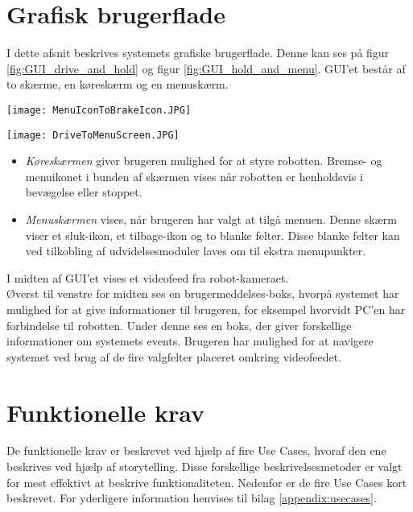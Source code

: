 \section{Grafisk brugerflade}
I dette afsnit beskrives systemets grafiske brugerflade. Denne kan ses på figur \ref{fig:GUI_drive_and_hold} og figur \ref{fig:GUI_hold_and_menu}.
GUI'et består af to skærme, en køreskærm og en menuskærm. 

\begin{center}
	\texttt{[image: MenuIconToBrakeIcon.JPG]}
	\label{fig:GUI_drive_and_hold}
\end{center}

\begin{center}
	\texttt{[image: DriveToMenuScreen.JPG]}
	\label{fig:GUI_hold_and_menu}
\end{center}


\begin{itemize}
	\item \textit{Køreskærmen} giver brugeren mulighed for at styre robotten. Bremse- og menuikonet i bunden af skærmen vises når robotten er henholdsvis i bevægelse eller stoppet.
	\item \textit{Menuskærmen} vises, når brugeren har valgt at tilgå menuen. Denne skærm viser et sluk-ikon, et tilbage-ikon og to blanke felter. Disse blanke felter kan ved tilkobling af udvidelsesmoduler laves om til ekstra menupunkter.
\end{itemize}

I midten af GUI'et vises et videofeed fra robot-kameraet. \\
Øverst til venstre for midten ses en brugermeddelses-boks, hvorpå systemet har mulighed for at give informationer til brugeren, for eksempel hvorvidt PC'en har forbindelse til robotten. 
Under denne ses en boks, der giver forskellige informationer om systemets events.
Brugeren har mulighed for at navigere systemet ved brug af de fire valgfelter placeret omkring videofeedet. 
\newpage

\section{Funktionelle krav}
De funktionelle krav er beskrevet ved hjælp af fire Use Cases, hvoraf den ene beskrives ved hjælp af storytelling. 
Disse forskellige beskrivelsesmetoder er valgt for mest effektivt at beskrive funktionaliteten.
Nedenfor er de fire Use Cases kort beskrevet. 
For yderligere information henvises til bilag \ref{appendix:usecases}.

